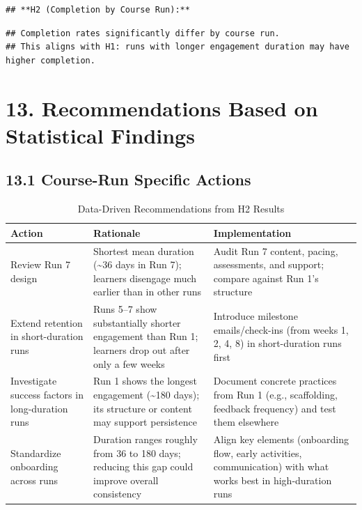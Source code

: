 \documentclass[
]{article}
\begin{document}
\begin{verbatim}
## **H2 (Completion by Course Run):**
\end{verbatim}

\begin{verbatim}
## Completion rates significantly differ by course run.
## This aligns with H1: runs with longer engagement duration may have higher completion.
\end{verbatim}

\section{13. Recommendations Based on Statistical
Findings}\label{recommendations-based-on-statistical-findings}

\subsection{13.1 Course-Run Specific
Actions}\label{course-run-specific-actions}

\begin{longtable}[t]{lll}
\caption{\label{tab:recommendations}Data-Driven Recommendations from H2 Results}\\
\toprule
Action & Rationale & Implementation\\
\midrule
Review Run 7 design & Shortest mean duration (\textasciitilde{}36 days in Run 7); learners disengage much earlier than in other runs & Audit Run 7 content, pacing, assessments, and support; compare against Run 1’s structure\\
Extend retention in short-duration runs & Runs 5–7 show substantially shorter engagement than Run 1; learners drop out after only a few weeks & Introduce milestone emails/check-ins (from weeks 1, 2, 4, 8) in short-duration runs first\\
Investigate success factors in long-duration runs & Run 1 shows the longest engagement (\textasciitilde{}180 days); its structure or content may support persistence & Document concrete practices from Run 1 (e.g., scaffolding, feedback frequency) and test them elsewhere\\
Standardize onboarding across runs & Duration ranges roughly from 36 to 180 days; reducing this gap could improve overall consistency & Align key elements (onboarding flow, early activities, communication) with what works best in high-duration runs\\
\bottomrule
\end{longtable}
\end{document}
